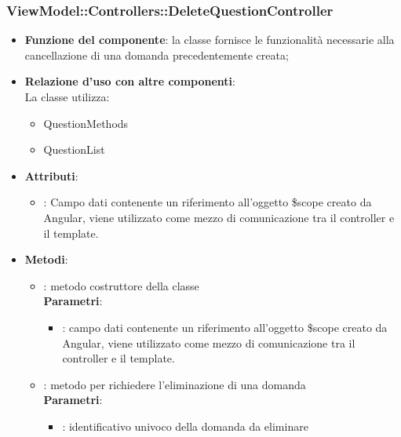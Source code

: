 \subsubsection{ViewModel::Controllers::DeleteQuestionController}
\begin{itemize}
\item\textbf{Funzione del componente}: la classe fornisce le funzionalità necessarie alla cancellazione di una domanda precedentemente creata;
	\item\textbf{Relazione d'uso con altre componenti}: \\
La classe utilizza:
	\begin{itemize}
		\item QuestionMethods
		\item QuestionList
	\end{itemize}
\item\textbf{Attributi}:
	\begin{itemize}
		\item{}: Campo dati contenente un riferimento all’oggetto \$scope creato da Angular, viene utilizzato come mezzo di comunicazione tra il controller e il template.\\

	\end{itemize}
\item\textbf{Metodi}:
	\begin{itemize}
		\item{}: metodo costruttore della classe\\
		\textbf{Parametri}:
			\begin{itemize}
				\item{}: campo dati contenente un riferimento all’oggetto \$scope creato da Angular, viene utilizzato come mezzo di comunicazione tra il controller e il template.\\
			\end{itemize}
		\item{}: metodo per richiedere l'eliminazione di una domanda\\
		\textbf{Parametri}:
			\begin{itemize}
				\item{}: identificativo univoco della domanda da eliminare\\
			\end{itemize}
	\end{itemize}
\end{itemize}

